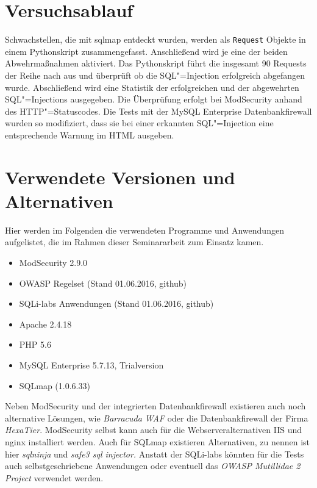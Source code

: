 \section{Versuchsablauf}

Schwachstellen, die mit sqlmap entdeckt wurden, werden als \texttt{Request} Objekte in einem Pythonskript zusammengefasst. Anschließend wird je eine der beiden Abwehrmaßnahmen aktiviert. Das Pythonskript führt die insgesamt 90 Requests der Reihe nach aus und überprüft ob die SQL"=Injection erfolgreich abgefangen wurde. Abschließend wird eine Statistik der erfolgreichen und der abgewehrten SQL"=Injections ausgegeben. Die Überprüfung erfolgt bei ModSecurity anhand des HTTP"=Statuscodes. Die Tests mit der MySQL Enterprise Datenbankfirewall wurden so modifiziert, dass sie bei einer erkannten SQL"=Injection eine entsprechende Warnung im HTML ausgeben.


\section{Verwendete Versionen und Alternativen}

Hier werden im Folgenden die verwendeten Programme und Anwendungen aufgelistet, die im Rahmen dieser Seminararbeit zum Einsatz kamen.

\begin{itemize}
    \item ModSecurity 2.9.0
    \item OWASP Regelset (Stand 01.06.2016, github)
    \item SQLi-labs Anwendungen (Stand 01.06.2016, github)
    \item Apache 2.4.18
    \item PHP 5.6
    \item MySQL Enterprise 5.7.13, Trialversion
    \item SQLmap (1.0.6.33)
\end{itemize}



Neben ModSecurity und der integrierten Datenbankfirewall existieren auch noch alternative Lösungen, wie \emph{Barracuda WAF} oder die Datenbankfirewall der Firma \emph{HexaTier}. ModSecurity selbst kann auch für die Webserveralternativen IIS und nginx installiert werden. Auch für SQLmap existieren Alternativen, zu nennen ist hier \emph{sqlninja} und \emph{safe3 sql injector.} Anstatt der SQLi-labs könnten für die Tests auch selbstgeschriebene Anwendungen oder eventuell das \emph{OWASP Mutillidae 2 Project} verwendet werden.











